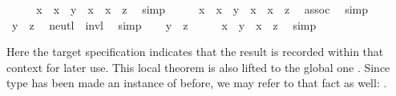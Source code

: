 \begin{isabellebody}
\ \ \isamarkupfalse%
\ \isamarkupfalse%
\ {\isachardoublequoteopen}x{\isasymdiv}\ {\isasymotimes}\ {\isacharparenleft}x\ {\isasymotimes}\ y{\isacharparenright}\ {\isacharequal}\ x{\isasymdiv}\ {\isasymotimes}\ {\isacharparenleft}x\ {\isasymotimes}\ z{\isacharparenright}{\isachardoublequoteclose}\ \isamarkupfalse%
\ simp\isanewline
\ \ \isamarkupfalse%
\ \isamarkupfalse%
\ {\isachardoublequoteopen}{\isacharparenleft}x{\isasymdiv}\ {\isasymotimes}\ x{\isacharparenright}\ {\isasymotimes}\ y\ {\isacharequal}\ {\isacharparenleft}x{\isasymdiv}\ {\isasymotimes}\ x{\isacharparenright}\ {\isasymotimes}\ z{\isachardoublequoteclose}\ \isamarkupfalse%
\ assoc\ \isamarkupfalse%
\ simp\isanewline
\ \ \isamarkupfalse%
\ \isamarkupfalse%
\ {\isachardoublequoteopen}y\ {\isacharequal}\ z{\isachardoublequoteclose}\ \isamarkupfalse%
\ neutl\ \ invl\ \isamarkupfalse%
\ simp\isanewline
{}\isamarkupfalse%
\isanewline
\ \ \isamarkupfalse%
\ {\isachardoublequoteopen}y\ {\isacharequal}\ z{\isachardoublequoteclose}\isanewline
\ \ \isamarkupfalse%
\ \isamarkupfalse%
\ {\isachardoublequoteopen}x\ {\isasymotimes}\ y\ {\isacharequal}\ x\ {\isasymotimes}\ z{\isachardoublequoteclose}\ \isamarkupfalse%
\ simp\isanewline
{}\isamarkupfalse%
%
\endisatagquote
{\isafoldquote}%
%
\isadelimquote
%
\endisadelimquote
%
\begin{isamarkuptext}%
\noindent Here the  target specification
  indicates that the result is recorded within that context for later
  use.  This local theorem is also lifted to the global one \hyperlink{fact.group.left-cancel:}{\mbox{}} .  Since type  has been made an instance of
   before, we may refer to that fact as well: .%
\end{isamarkuptext}%

\end{isabellebody}
